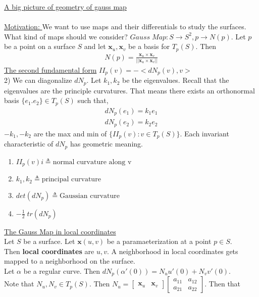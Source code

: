 \documentclass[12pt,letterpaper]{hmcpset}
\begin{document}
\underline{A big picture of geometry of gauss map} \\\\
\underline{Motivation: } We want to use maps and their differentials to study
the surfaces. What kind of maps should we consider? $Gauss\; Map: S \rightarrow S^2, p \rightarrow
N(p)$. Let $p$ be a point on a surface $S$ and let $\mathbf{x}_u, \mathbf{x}_v$
be a basis for $T_p(S)$. Then
\begin{align*}
  N(p) = \frac{\mathbf{x}_u \times \mathbf{x}_v}{||\mathbf{x}_u \times \mathbf{x}_v||}
\end{align*}
\underline{The second fundamental form}
$II_p(v) = -<dN_p(v), v>$\\
2) We can diagonalize $dN_p$. Let $k_1, k_2$ be the eigenvalues. Recall that the
eigenvalues are the principle curvatures. That means there exists an orthonormal basis
$\{e_1. e_2\} \in T_p(S)$ such that,
\begin{align*}
  dN_p(e_1) = k_1e_1 \\
  dN_p(e_2) = k_2e_2
\end{align*}
$-k_1, -k_2$ are the max and min of $\{II_p(v) : v \in T_p(S) \}$. Each invariant
characteristic of $dN_p$ has geometric meaning.
\begin{enumerate}
\item  $II_p(v)i \triangleq \text{normal curvature along v}$
\item $k_1, k_2 \triangleq \text{principal curvature}$
\item $det(dN_p) \triangleq \text{Gaussian curvature}$
\item $-\frac{1}{2}\; tr(dN_p)$
\end{enumerate}
\underline{The Gauss Map in local coordinates} \\
Let $S$ be a surface.
Let $\mathbf{x}(u, v)$ be a paramaeterization at a point $p \in S$. \\
Then \textbf{local coordinates} are $u, v$.
A neighborhood in local coordinates gets mapped to a neighborhood on the
surface. \\
Let $\alpha$ be a regular curve. Then $dN_p(\alpha'(0)) = N_u u'(0) + N_v v'(0)$. \\
Note that $N_u, N_v \in T_p(S)$. Then $N_u=\begin{bmatrix}\mathbf{x}_u &
  \mathbf{x}_v\end{bmatrix}\begin{bmatrix}a_{11} & a_{12}\\a_{21} &
  a_{22}\end{bmatrix}$. Then that
\end{document}
